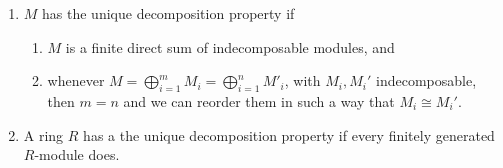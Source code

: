 \begin{enumerate}[label=(\alph*)]
	\item $M$ has the unique decomposition property if
		\begin{enumerate}[label=(\roman*)]
			\item $M$ is a finite direct sum of indecomposable modules, and
			\item whenever $M = \bigoplus_{i=1}^m M_i = \bigoplus_{i=1}^n M'_i$,
				with $M_i, M_i'$ indecomposable, then $m = n$ and we can reorder
				them in such a way that $M_i\cong M_i'$.
		\end{enumerate}
	\item A ring $R$ has a the unique decomposition property if every finitely generated
		$R$-module does.
\end{enumerate}
